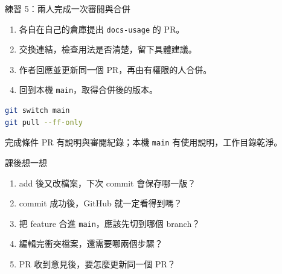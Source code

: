 \documentclass[xetex, unicode, 10pt, aspectratio=169]{beamer}
\begin{document}
\begin{frame}[fragile]{練習 5：兩人完成一次審閱與合併}
    \begin{enumerate}
        \item 各自在自己的倉庫提出 \texttt{docs-usage} 的 PR。
        \item 交換連結，檢查用法是否清楚，留下具體建議。
        \item 作者回應並更新同一個 PR，再由有權限的人合併。
        \item 回到本機 \texttt{main}，取得合併後的版本。
    \end{enumerate}
\begin{lstlisting}[language=bash]
git switch main
git pull --ff-only
\end{lstlisting}
    \begin{block}{完成條件}
        PR 有說明與審閱紀錄；本機 \texttt{main} 有使用說明，工作目錄乾淨。
    \end{block}
\end{frame}

\begin{frame}{課後想一想}
    \linespread{1.625}\selectfont
    \begin{enumerate}
        \item add 後又改檔案，下次 commit 會保存哪一版？
        \item commit 成功後，GitHub 就一定看得到嗎？
        \item 把 feature 合進 \texttt{main}，應該先切到哪個 branch？
        \item 編輯完衝突檔案，還需要哪兩個步驟？
        \item PR 收到意見後，要怎麼更新同一個 PR？
    \end{enumerate}
\end{frame}
\end{document}
